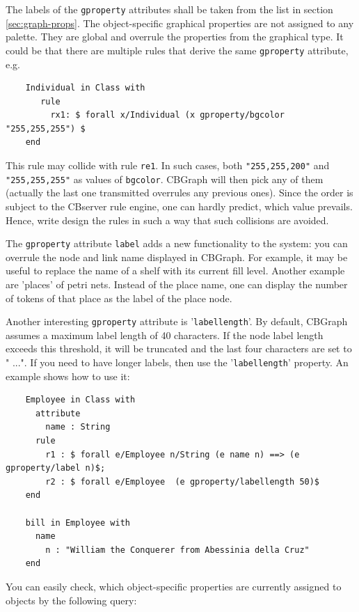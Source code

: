 The labels of the {\tt gproperty} attributes shall be taken from the list in section
\ref{sec:graph-props}.
The object-specific graphical properties are not assigned to any palette. They are global
and overrule the properties from the graphical type. It could be that there are multiple rules
that derive the same {\tt gproperty} attribute, e.g.

{\small
\begin{verbatim}
    Individual in Class with
       rule
         rx1: $ forall x/Individual (x gproperty/bgcolor "255,255,255") $
    end
\end{verbatim}
}

This rule may collide with rule {\tt re1}. In such cases, both {\tt "255,255,200"}
and {\tt "255,255,255"} as values of {\tt bgcolor}. CBGraph will then pick any of them
(actually the last one transmitted overrules any previous ones). Since the order is
subject to the CBserver rule engine, one can hardly predict, which value prevails.
Hence, write design the rules in such a way that such collisions are avoided.


The {\tt gproperty} attribute {\tt label} adds a new functionality to the system:
you can overrule the node and link name displayed in CBGraph. For example, it may be useful
to replace the name of a shelf with its current fill level. Another example are 'places'
of petri nets. Instead of the place name, one can display the number of tokens of that
place as the label of the place node. 

Another interesting {\tt gproperty} attribute is '{\tt labellength}'. By default, CBGraph
assumes a maximum label length of 40 characters. If the node label length exceeds this
threshold, it will be truncated and the last four characters are set to " ...". If
you need to have longer labels, then use the '{\tt labellength}' property. An example shows
how to use it:

{\small
\begin{verbatim}
    Employee in Class with  
      attribute
        name : String
      rule
        r1 : $ forall e/Employee n/String (e name n) ==> (e gproperty/label n)$;
        r2 : $ forall e/Employee  (e gproperty/labellength 50)$
    end 

    bill in Employee with  
      name
        n : "William the Conquerer from Abessinia della Cruz"
    end
\end{verbatim}
}



You can easily check, which object-specific properties are currently assigned to objects
by the following query:

